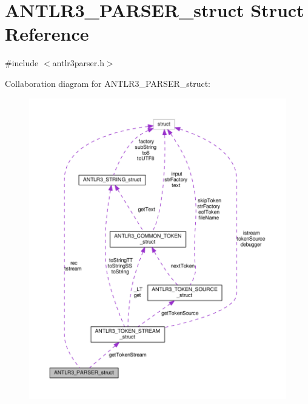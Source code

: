 \hypertarget{struct_a_n_t_l_r3___p_a_r_s_e_r__struct}{\section{A\-N\-T\-L\-R3\-\_\-\-P\-A\-R\-S\-E\-R\-\_\-struct Struct Reference}
\label{struct_a_n_t_l_r3___p_a_r_s_e_r__struct}
}


{\ttfamily \#include $<$antlr3parser.\-h$>$}



Collaboration diagram for A\-N\-T\-L\-R3\-\_\-\-P\-A\-R\-S\-E\-R\-\_\-struct\-:
\nopagebreak
\begin{figure}[H]
\begin{center}
\leavevmode
\includegraphics[width=350pt]{struct_a_n_t_l_r3___p_a_r_s_e_r__struct__coll__graph}
\end{center}
\end{figure}

